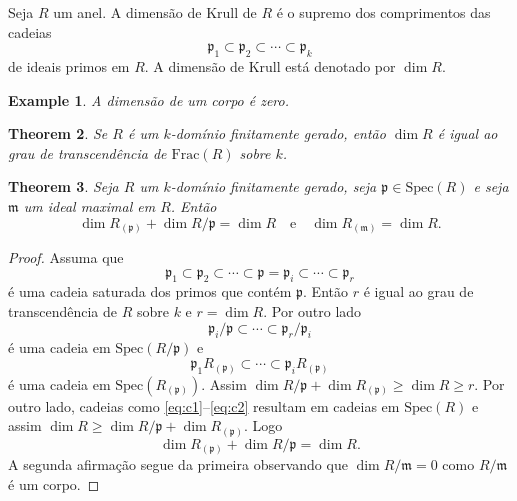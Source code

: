 \documentclass[12pt]{amsart}
\newcommand{\m}{\mathfrak m}
\newcommand{\p}{\mathfrak p}
\newcommand{\fracf}[1]{\mbox{Frac}(#1)}
\newcommand{\spec}[1]{\mbox{Spec}(#1)}
\newtheorem{theorem}{Theorem}
\newtheorem{definition}[theorem]{Definition}
\newtheorem{example}[theorem]{Example}
\begin{document}
    Seja $R$ um anel. A dimensão de Krull de $R$ é o supremo dos comprimentos das cadeias 
    \[
        \p_1\subset\p_2\subset \cdots \subset \p_k
    \]
    de ideais primos em $R$. A dimensão de Krull está denotado por $\dim R$. 

\begin{example}
    A dimensão de um corpo é zero.
\end{example}

\begin{theorem}
    Se $R$ é um $k$-domínio finitamente gerado, então $\dim R$ é igual ao grau de transcendência de $\fracf R$ sobre $k$. 
\end{theorem}

\begin{theorem}
    Seja $R$ um $k$-domínio finitamente gerado, seja $\p\in\spec R$ e seja $\m$ um ideal maximal em $R$.   
    Então 
    \[
        \dim R_{(\p)}+\dim R/\p=\dim R\quad\mbox{e}\quad \dim R_{(\m)}=\dim R. 
    \]
\end{theorem}
\begin{proof}
Assuma que 
\[
    \p_1\subset \p_2\subset \cdots\subset \p=\p_i\subset\cdots \subset \p_r
\]
é uma cadeia saturada dos primos que contém $\p$. Então $r$ é   igual ao grau de transcendência de $R$ sobre $k$ e $r=\dim R$. Por outro lado 
\begin{equation}\label{eq:c1}
    \p_i/\p\subset \cdots\subset \p_r/\p_i
\end{equation}
é uma cadeia em $\spec{R/\p}$ e 
\begin{equation}\label{eq:c2}
    \p_1 R_{(\p)}\subset \cdots \subset\p_i R_{(\p)}
\end{equation}
é uma cadeia em $\spec{R_{(\p)}}$. Assim $\dim R/\p+\dim R_{(\p)}\geq \dim R\geq r$. 
Por outro lado, cadeias como \eqref{eq:c1}--\eqref{eq:c2} resultam em cadeias em $\spec R$ e assim $\dim R\geq 
\dim R/\p+\dim R_{(\p)}$.  Logo  
\[
    \dim R_{(\p)}+\dim R/\p=\dim R.
\] 
A segunda afirmação segue da primeira observando que $\dim R/\m=0$ como $R/\m$ é um corpo.
\end{proof}
\end{document}
